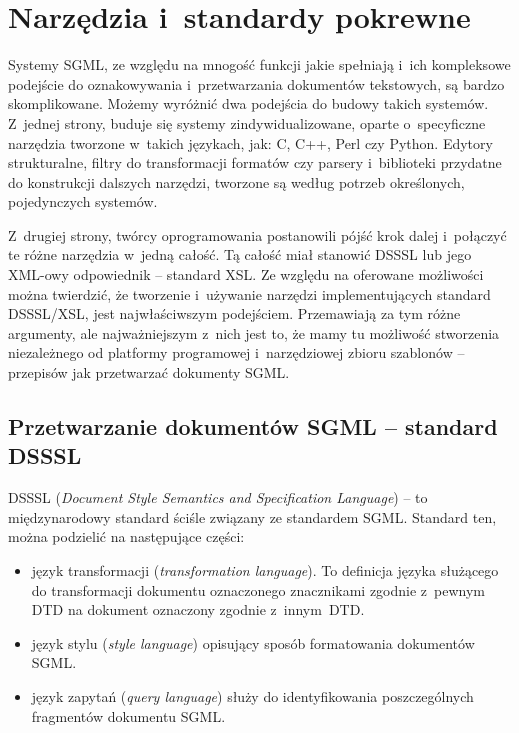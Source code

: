 \documentclass[document]{xmgr}
\begin{document}
\chapter{Narzędzia i~standardy pokrewne}

Systemy SGML, ze względu na mnogość funkcji jakie spełniają i~ich
kompleksowe podejście do oznakowywania i~przetwarzania dokumentów
tekstowych, są bardzo skomplikowane. Możemy wyróżnić dwa podejścia do
budowy takich systemów.  Z~jednej strony, buduje się systemy
zindywidualizowane, oparte o~specyficzne narzędzia tworzone w~takich
językach, jak: C, C++, Perl czy Python. Edytory strukturalne, filtry
do transformacji formatów czy parsery i~biblioteki
przydatne do konstrukcji dalszych narzędzi, tworzone są według potrzeb
określonych, pojedynczych systemów.

Z~drugiej strony, twórcy oprogramowania postanowili pójść krok dalej
i~połączyć te różne narzędzia w~jedną całość. Tą całość miał stanowić
DSSSL lub jego XML-owy odpowiednik -- standard XSL. Ze względu na
oferowane możliwości można twierdzić, że tworzenie i~używanie narzędzi
implementujących standard DSSSL/XSL, jest najwłaściwszym
podejściem. Przemawiają za tym różne argumenty, ale najważniejszym
z~nich jest to, że mamy tu możliwość stworzenia niezależnego od
platformy programowej i~narzędziowej zbioru szablonów -- przepisów jak
przetwarzać dokumenty SGML.

\section{Przetwarzanie dokumentów SGML -- standard DSSSL\label{s:dsssl}}

DSSSL (\textit{Document Style Semantics and Specification Language\/})
-- to międzynarodowy standard ściśle związany ze standardem SGML.
Standard ten, można podzielić na następujące części:

\begin{itemize}
\item język transformacji (\textit{transformation language\/}).  To
  definicja języka służącego do transformacji dokumentu oznaczonego
  znacznikami zgodnie z~pewnym DTD na dokument oznaczony zgodnie
  z~innym~DTD.
\item język stylu (\textit{style language\/}) opisujący sposób
  formatowania dokumentów SGML.
\item język zapytań (\textit{query language\/}) służy do
  identyfikowania poszczególnych fragmentów dokumentu SGML.
\end{itemize}
\end{document}
